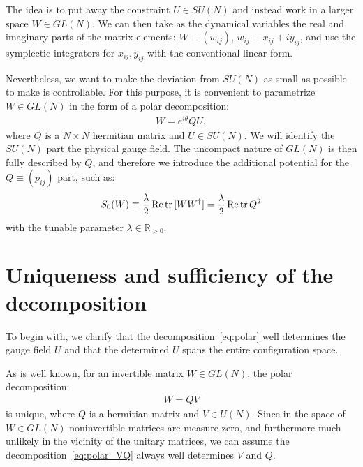 \documentclass[12pt]{article}
\begin{document}
The idea is to put away the constraint $U \in SU(N)$
and instead work in a larger space $W \in GL(N)$.
We can then take as the dynamical variables the real and imaginary parts
of the matrix elements:
$W \equiv (w_{ij})$, $w_{ij} \equiv x_{ij}+iy_{ij}$,
and use the symplectic integrators
for $x_{ij}, y_{ij}$ with the conventional linear form.

Nevertheless, we want to make the deviation
from $SU(N)$ as small as possible
to make is controllable.
For this purpose, it is convenient to parametrize $W \in GL(N)$
in the form of a polar decomposition:
\begin{align}
  W = e^{i\theta} Q U,
  \label{eq:polar}
\end{align}
where $Q$ is a $N\times N$ hermitian matrix and $U \in SU(N)$.
We will identify the $SU(N)$ part the physical gauge field.
The uncompact nature of $GL(N)$ is then fully described by $Q$,
and therefore we introduce the additional potential
for the $Q\equiv (p_{ij})$ part, such as:
\begin{align}
  S_0(W)
  \equiv \frac{\lambda}{2} \, {\rm Re}\,{\rm tr} \,[W W^\dagger]
  = \frac{\lambda}{2} \,{\rm Re}\,{\rm tr} \,Q^2
  \label{eq:s0}
\end{align}
with the tunable parameter $\lambda \in \mathbb{R}_{>0}$.


\section{Uniqueness and sufficiency of the decomposition}
\label{sec:polar}

To begin with,
we clarify that the decomposition~\eqref{eq:polar}
well determines the gauge field $U$ and
that the determined $U$ spans the entire configuration space.

As is well known, for an invertible matrix $W \in GL(N)$,
the polar decomposition:
\begin{align}
  W = Q V
  \label{eq:polar_VQ}
\end{align}
is unique, where $Q$ is a hermitian matrix and $V \in U(N)$.
Since in the space of $W \in GL(N)$
noninvertible matrices are measure zero,
and furthermore much unlikely in the vicinity of the unitary matrices,
we can assume the decomposition~\eqref{eq:polar_VQ}
always well determines $V$ and $Q$.
\end{document}
